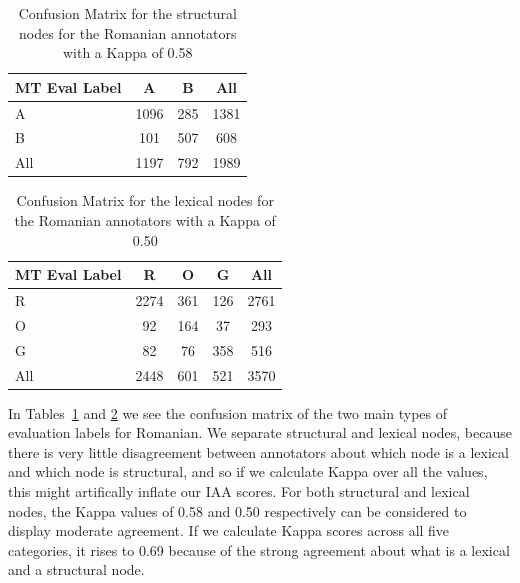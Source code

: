 \documentclass[11pt]{article}
\begin{document}
\begin{table}[h!]
\begin{center}
      \begin{tabular}{|l|cc|c|}
      \hline
\bf{MT Eval Label} & \bf{A} & \bf{B} & \bf{All} \\
\hline                               
    A   & 1096 &  285 & 1381\\ 
   B   & 101 & 507  & 608\\ 
   \hline
   All &  1197 &  792 & 1989\\
      \hline
    \end{tabular}
\end{center}
\normalsize
\vspace*{-3ex}
\caption{Confusion Matrix for the structural nodes for the Romanian annotators with a Kappa of 0.58
}
\label{tab:iaa-ab-ro}
\end{table}

\begin{table}[h!]
\begin{center}
      \begin{tabular}{|l|ccc|c|}
      \hline
\bf{MT Eval Label} & \bf{R} & \bf{O} & \bf{G} & \bf{All} \\
\hline                               
   R   & 2274 &  361 & 126 & 2761 \\ 
   O   & 92 & 164  & 37 & 293 \\ 
   G   & 82 & 76  & 358 & 516 \\ 
   \hline
   All &  2448 &  601 & 521 & 3570\\
      \hline
    \end{tabular}
\end{center}
\normalsize
\vspace*{-3ex}
\caption{Confusion Matrix for the lexical nodes for the Romanian annotators with a Kappa of 0.50
}
\label{tab:iaa-rgo-ro}
\end{table}

In Tables~\ref{tab:iaa-ab-ro} and \ref{tab:iaa-rgo-ro} we see the confusion matrix of
the two main types of evaluation labels for Romanian. We separate structural and lexical nodes, because
there is very little disagreement between annotators about which node is a lexical and which
node is structural, and so if we calculate Kappa over all the values, this might artifically 
inflate our IAA scores.
For both structural and lexical nodes, the Kappa values 
of 0.58 and 0.50 respectively 
can
be considered to display moderate agreement. 
If we calculate Kappa scores across all five categories, it rises to 
0.69 because of the strong agreement about what is a lexical and a structural 
node. 
\end{document}
